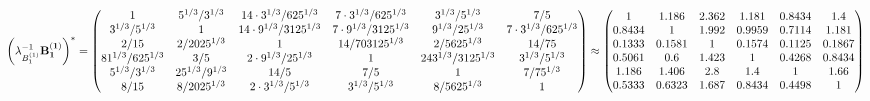 \documentclass[10pt,a4paper]{article}
\begin{document}
	\[
		\left(\lambda_{B_1^{(1)}}^{-1}\bold{B_1^{(1)}}\right)^* = 
		\begin{pmatrix}
			{1}{} & {{5^ {1 / 3}}} / {{3^ {1 / 3}}} & {{14} \cdot {3^ {1 / 3}}} / {{625^ {1 / 3}}} & {{7} \cdot {3^ {1 / 3}}} / {{625^ {1 / 3}}} & {{3^ {1 / 3}}} / {{5^ {1 / 3}}} & {{7}} / {{5}} \\
			{{3^ {1 / 3}}} / {{5^ {1 / 3}}} & {1}{} & {{14} \cdot {9^ {1 / 3}}} / {{3125^ {1 / 3}}} & {{7} \cdot {9^ {1 / 3}}} / {{3125^ {1 / 3}}} & {{9^ {1 / 3}}} / {{25^ {1 / 3}}} & {{7} \cdot {3^ {1 / 3}}} / {{625^ {1 / 3}}} \\
			{{2}} / {{15}} & {{2}} / {{2025^ {1 / 3}}} & {1}{} & {{14}} / {{703125^ {1 / 3}}} & {{2}} / {{5625^ {1 / 3}}} & {{14}} / {{75}} \\
			{{81^ {1 / 3}}} / {{625^ {1 / 3}}} & {{3}} / {{5}} & {{2} \cdot {9^ {1 / 3}}} / {{25^ {1 / 3}}} & {1}{} & {{243^ {1 / 3}}} / {{3125^ {1 / 3}}} & {{3^ {1 / 3}}} / {{5^ {1 / 3}}} \\
			{{5^ {1 / 3}}} / {{3^ {1 / 3}}} & {{25^ {1 / 3}}} / {{9^ {1 / 3}}} & {{14}} / {{5}} & {{7}} / {{5}} & {1}{} & {{7}} / {{75^ {1 / 3}}} \\
			{{8}} / {{15}} & {{8}} / {{2025^ {1 / 3}}} & {{2} \cdot {3^ {1 / 3}}} / {{5^ {1 / 3}}} & {{3^ {1 / 3}}} / {{5^ {1 / 3}}} & {{8}} / {{5625^ {1 / 3}}} & {1}{} \\
		\end{pmatrix}
		\approx
		\begin{pmatrix}
			1        & 1.186    & 2.362    & 1.181    & 0.8434   & 1.4      \\
			0.8434   & 1        & 1.992    & 0.9959   & 0.7114   & 1.181    \\
			0.1333   & 0.1581   & 1        & 0.1574   & 0.1125   & 0.1867   \\
			0.5061   & 0.6      & 1.423    & 1        & 0.4268   & 0.8434   \\
			1.186    & 1.406    & 2.8      & 1.4      & 1        & 1.66     \\
			0.5333   & 0.6323   & 1.687    & 0.8434   & 0.4498   & 1        \\
		\end{pmatrix}
	\]
\end{document}
